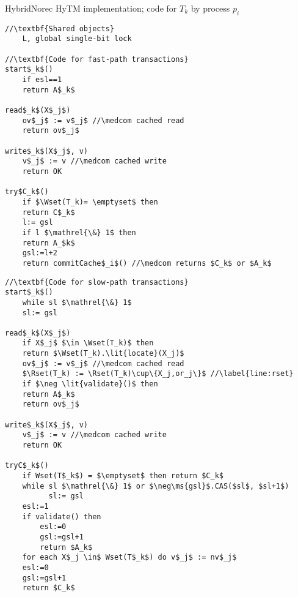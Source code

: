 \begin{algorithm*}[!h]
\caption{HybridNorec HyTM implementation; code for $T_k$ by process $p_i$}
\label{alg:inswrite3}
\vspace{-1mm}
\noindent\lstset{style=customc}
\begin{minipage}{0.49\textwidth}
\begin{lstlisting}[frame=none,firstnumber=1,mathescape=true]
//\textbf{Shared objects}
    L, global single-bit lock

//\textbf{Code for fast-path transactions}
start$_k$()
    if esl==1
	return A$_k$

read$_k$(X$_j$)
    ov$_j$ := v$_j$ //\medcom cached read
    return ov$_j$

write$_k$(X$_j$, v)
    v$_j$ := v //\medcom cached write
    return OK

try$C_k$()
    if $\Wset(T_k)= \emptyset$ then
	return C$_k$
    l:= gsl
    if l $\mathrel{\&} 1$ then
	return A_$k$
    gsl:=l+2
    return commitCache$_i$() //\medcom returns $C_k$ or $A_k$
\end{lstlisting}
\end{minipage}
\begin{minipage}{0.49\textwidth}
\begin{lstlisting}[frame=none,firstnumber=last,mathescape=true]
//\textbf{Code for slow-path transactions}
start$_k$()
    while sl $\mathrel{\&} 1$
	sl:= gsl

read$_k$(X$_j$)
    if X$_j$ $\in \Wset(T_k)$ then
	return $\Wset(T_k).\lit{locate}(X_j)$ 
    ov$_j$ := v$_j$ //\medcom cached read
    $\Rset(T_k) := \Rset(T_k)\cup\{X_j,or_j\}$ //\label{line:rset}
    if $\neg \lit{validate}()$ then 
	return A$_k$
    return ov$_j$

write$_k$(X$_j$, v)
    v$_j$ := v //\medcom cached write
    return OK

tryC$_k$()
    if Wset(T$_k$) = $\emptyset$ then return $C_k$
    while sl $\mathrel{\&} 1$ or $\neg\ms{gsl}$.CAS($sl$, $sl+1$)  
          sl:= gsl
    esl:=1
    if validate() then
        esl:=0
        gsl:=gsl+1
        return $A_k$
    for each X$_j \in$ Wset(T$_k$) do v$_j$ := nv$_j$
    esl:=0
    gsl:=gsl+1
    return $C_k$
\end{lstlisting}
\end{minipage}
\vspace{-1mm}
\end{algorithm*}


